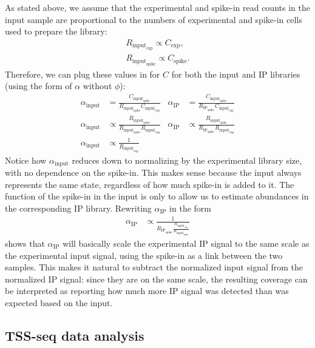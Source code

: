 As stated above, we assume that the experimental and spike-in read counts in the input sample are proportional to the numbers of experimental and spike-in cells used to prepare the library:
\begin{align*}
    R_{\text{input}_\text{exp}} \propto C_\text{exp}, \\
    R_{\text{input}_\text{spike}} \propto C_\text{spike}.
\end{align*}
Therefore, we can plug these values in for $C$ for both the input and IP libraries (using the form of $\alpha$ without $\phi$):
\begin{align*}
    \alpha_\text{input} &= \frac{C_{\text{input}_\text{spike}}}{R_{\text{input}_\text{spike}} C_{\text{input}_\text{exp}}} &
    \alpha_\text{IP} &= \frac{C_{\text{input}_\text{spike}}}{R_{\text{IP}_\text{spike}} C_{\text{input}_\text{exp}}} \\
    \alpha_\text{input} &\propto \frac{R_{\text{input}_\text{spike}}}{R_{\text{input}_\text{spike}} R_{\text{input}_\text{exp}}} &
    \alpha_\text{IP} &\propto \frac{R_{\text{input}_\text{spike}}}{R_{\text{IP}_\text{spike}} R_{\text{input}_\text{exp}}} \\
    \alpha_\text{input} &\propto \frac{1}{R_{\text{input}_\text{exp}}} &
\end{align*}
Notice how $\alpha_\text{input}$ reduces down to normalizing by the experimental library size, with no dependence on the spike-in.
This makes sense because the input always represents the same state, regardless of how much spike-in is added to it.
The function of the spike-in in the input is only to allow us to estimate abundances in the corresponding IP library.
Rewriting $\alpha_\text{IP}$ in the form
\begin{align*}
    \alpha_\text{IP} &\propto \frac{1}{R_{\text{IP}_\text{spike}} \frac{R_{\text{input}_\text{exp}}}{R_{\text{input}_\text{spike}}}}
\end{align*}
shows that $\alpha_\text{IP}$ will basically scale the experimental IP signal to the same scale as the experimental input signal, using the spike-in as a link between the two samples.
This makes it natural to subtract the normalized input signal from the normalized IP signal: since they are on the same scale, the resulting coverage can be interpreted as reporting how much more IP signal was detected than was expected based on the input.

\subsection{TSS-seq data analysis}

